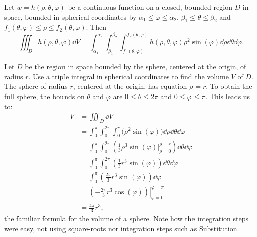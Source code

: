 \begin{theorem}\label{thm:triple_int_spherical}%
Let $w=h(\rho,\theta,\varphi)$ be a continuous function on a closed, bounded region $D$ in space, bounded in spherical coordinates by $\alpha_1 \leq \varphi \leq \alpha_2$, $\beta_1 \leq \theta \leq \beta_2$ and $f_1(\theta,\varphi) \leq \rho \leq f_2(\theta,\varphi)$. Then 
\[
\iiint_D h(\rho,\theta,\varphi)\dd V = \int_{\alpha_1}^{\alpha_2}\int_{\beta_1}^{\beta_2}\int_{f_1(\theta,\varphi)}^{f_2(\theta,\varphi)} h(\rho,\theta,\varphi) \rho^2\sin(\varphi)\dd\rho\dd\theta\dd\varphi.
\]
\end{theorem}

\begin{example}\label{ex_spherical2}%
Let $D$ be the region in space bounded by the sphere, centered at the origin, of radius $r$. Use a triple integral in spherical coordinates to find the volume $V$ of $D$.
\solution
The sphere of radius $r$, centered at the origin, has equation $\rho = r$. To obtain the full sphere, the bounds on $\theta$ and $\varphi$ are $0\leq \theta \leq 2\pi$ and $0 \leq \varphi \leq \pi$. This leads us to:
\begin{align*}
V &= \iiint_D\dd V\\
	&= \int_0^{\pi}\int_0^{2\pi}\int_0^r\bigl(\rho^2\sin(\varphi)\bigr)\dd\rho\dd\theta\dd\varphi\\
	&= \int_0^\pi\int_0^{2\pi}\left(\frac13\rho^3\sin(\varphi)\Bigr|_{\rho=0}^{\rho=r}\right)\dd\theta\dd\varphi\\
	&= \int_0^\pi\int_0^{2\pi} \left(\frac13r^3\sin(\varphi)\right)\dd\theta\dd\varphi\\
	&= \int_0^\pi \left(\frac{2\pi}3r^3\sin(\varphi)\right)\dd\varphi\\
	&= \left.\left(-\frac{2\pi}3r^3\cos(\varphi)\right)\right|_{\varphi=0}^{\varphi=\pi}\\
	&= \frac{4\pi}3r^3,
\end{align*}
the familiar formula for the volume of a sphere. Note how the integration steps were easy, not using square-roots nor integration steps such as Substitution.
\end{example}


